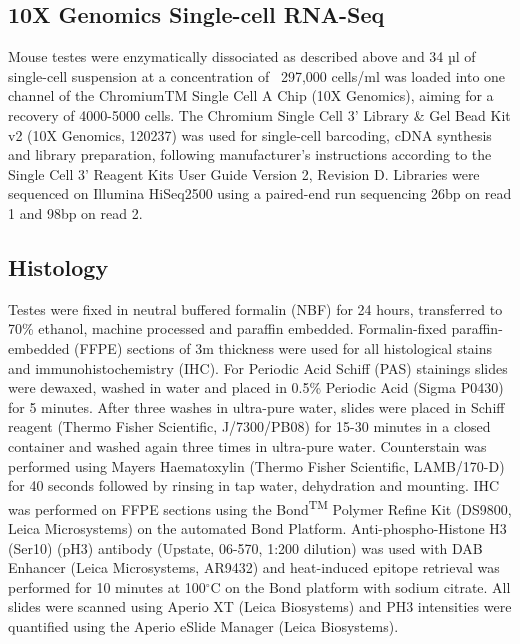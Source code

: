 \subsection{10X Genomics Single-cell RNA-Seq}

Mouse testes were enzymatically dissociated as described above and 34 µl of single-cell suspension at a concentration of ~297,000 cells/ml was loaded into one channel of the ChromiumTM Single Cell A Chip (10X Genomics\textsuperscript{\textregistered}), aiming for a recovery of 4000-5000 cells. The Chromium Single Cell 3’ Library \& Gel Bead Kit v2 (10X Genomics\textsuperscript{\textregistered}, 120237) was used for single-cell barcoding, cDNA synthesis and library preparation, following manufacturer’s instructions according to the Single Cell 3’ Reagent Kits User Guide Version 2, Revision D. Libraries were sequenced on Illumina HiSeq2500 using a paired-end run sequencing 26bp on read 1 and 98bp on read 2. 

\subsection{Histology}
Testes were fixed in neutral buffered formalin (NBF) for 24 hours, transferred to 70\% ethanol, machine processed and paraffin embedded. Formalin-fixed paraffin-embedded (FFPE) sections of 3\textmu{}m thickness were used for all histological stains and immunohistochemistry (IHC). For Periodic Acid Schiff (PAS) stainings slides were dewaxed, washed in water and placed in 0.5\% Periodic Acid (Sigma P0430) for 5 minutes. After three washes in ultra-pure water, slides were placed in Schiff reagent (Thermo Fisher Scientific, J/7300/PB08) for 15-30 minutes in a closed container and washed again three times in ultra-pure water. Counterstain was performed using Mayers Haematoxylin (Thermo Fisher Scientific, LAMB/170-D) for 40 seconds followed by rinsing in tap water, dehydration and mounting. IHC was performed on FFPE sections using the Bond\textsuperscript{TM} Polymer Refine Kit (DS9800, Leica Microsystems) on the automated Bond Platform. Anti-phospho-Histone H3 (Ser10) (pH3) antibody (Upstate, 06-570, 1:200 dilution) was used with DAB Enhancer (Leica Microsystems, AR9432) and heat-induced epitope retrieval was performed for 10 minutes at 100$^\circ$C on the Bond platform with sodium citrate. All slides were scanned using Aperio XT (Leica Biosystems) and PH3 intensities were quantified using the Aperio eSlide Manager (Leica Biosystems). 

\newpage

